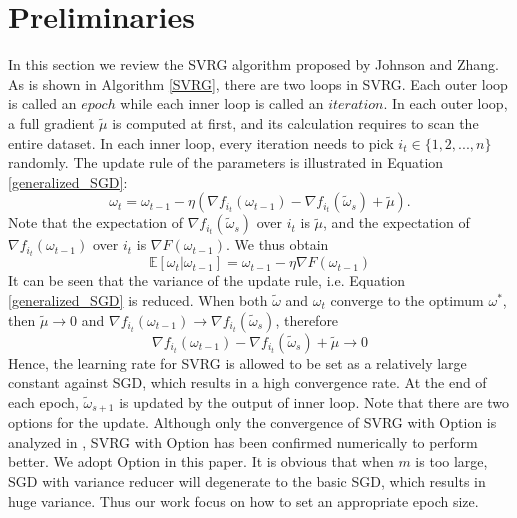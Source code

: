 \documentclass[conference]{IEEEtran}
\begin{document}
\section{Preliminaries}
\label{svrg_review}
 In this section we review the SVRG algorithm proposed by Johnson and Zhang\citep{Johnson:9MAvkbgy}.  As is shown in Algorithm \ref{SVRG}, there are two loops in SVRG. Each outer loop is called an $epoch$ while each inner loop is called an $iteration$. In each outer loop, a full gradient $\tilde{\mu}$ is computed at first, and its calculation requires to scan the entire dataset. In each inner loop,  every iteration needs to pick $i_t\in\{1, 2, ..., n\}$ randomly. The update rule of the parameters is illustrated in Equation \ref{generalized_SGD}:
\begin{equation}
\label{generalized_SGD}
\omega_t = \omega_{t-1} - \eta(\nabla f_{i_t}(\omega_{t-1}) - \nabla f_{i_t}(\tilde{\omega}_s)+\tilde{\mu}).
\end{equation}
Note that the expectation of $\nabla f_{i_t}(\tilde{\omega}_s)$ over $i_t$ is $\tilde{\mu}$, and the expectation of $\nabla f_{i_t}(\omega_{t-1})$ over $i_t$ is $\nabla F(\omega_{t-1})$. We thus obtain
\begin{equation}
\mathbb{E}[\omega_{t} | \omega_{t-1}] = \omega_{t-1} - \eta\nabla F(\omega_{t-1})
\end{equation}
 It can be seen that the variance of the update rule, i.e. Equation \ref{generalized_SGD} is reduced. When both $\tilde{\omega}$ and $\omega_t$ converge to the optimum $\omega^*$, then $\tilde{\mu}\rightarrow0$ and $\nabla f_{i_t}(\omega_{t-1})\rightarrow\nabla f_{i_t}(\tilde{\omega}_s)$, therefore
 $$\nabla f_{i_t}(\omega_{t-1}) - \nabla f_{i_t}(\tilde{\omega}_s)+\tilde{\mu}\rightarrow0$$
 Hence, the learning rate for SVRG is allowed to be set as a relatively large constant against SGD, which results in a high convergence rate.
At the end of each epoch, $\tilde\omega_{s+1}$ is updated by the output of inner loop. Note that there are two options for the update. Although only the convergence of SVRG with Option \uppercase\expandafter{} is analyzed in \citep{Johnson:9MAvkbgy}, SVRG with Option \uppercase\expandafter{} has been confirmed numerically to perform better. We adopt Option \uppercase\expandafter{} in this paper. It is obvious that when $m$ is too large, SGD with variance reducer will degenerate to the basic SGD, which results in huge variance. Thus our work focus on how to set an appropriate epoch size.
 
\end{document}
